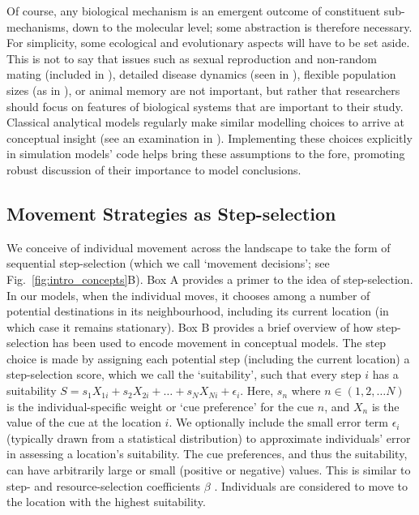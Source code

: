 Of course, any biological mechanism is an emergent outcome of constituent sub-mechanisms, down to the molecular level; some abstraction is therefore necessary.
For simplicity, some ecological and evolutionary aspects will have to be set aside.
This is not to say that issues such as sexual reproduction and non-random mating (included in \cite{getz2016}), detailed disease dynamics (seen in \cite{white2018,scherer2020}), flexible population sizes (as in \cite{netz2021}), or animal memory \parencite[e.g.][]{bracis2017,robira2021} are not important, but rather that researchers should focus on features of biological systems that are important to their study.
Classical analytical models regularly make similar modelling choices to arrive at conceptual insight (see an examination in \cite{vandermeer1997}).
Implementing these choices explicitly in simulation models' code helps bring these assumptions to the fore, promoting robust discussion of their importance to model conclusions.

\subsection*{Movement Strategies as Step-selection}

We conceive of individual movement across the landscape to take the form of sequential step-selection (which we call `movement decisions'; see Fig.~\ref{fig:intro_concepts}B).
Box A provides a primer to the idea of step-selection.
In our models, when the individual moves, it chooses among a number of potential destinations in its neighbourhood, including its current location (in which case it remains stationary).
Box B provides a brief overview of how step-selection has been used to encode movement in conceptual models.
The step choice is made by assigning each potential step (including the current location) a step-selection score, which we call the `suitability', such that every step $i$ has a suitability $S = s_{1}X_{1i} + s_{2}X_{2i} + \ldots + s_{N}X_{Ni} + \epsilon_i$.
Here, $s_n$ where $n \in (1, 2, \ldots N)$ is the individual-specific weight or `cue preference' for the cue $n$, and $X_n$ is the value of the cue at the location $i$.
We optionally include the small error term $\epsilon_i$ (typically drawn from a statistical distribution) to approximate individuals' error in assessing a location's suitability.
The cue preferences, and thus the suitability, can have arbitrarily large or small (positive or negative) values.
This is similar to step- and resource-selection coefficients $\beta$ \parencite[see Box A][]{fortin2005,manly2002}.
Individuals are considered to move to the location with the highest suitability.


